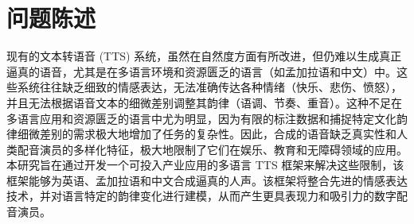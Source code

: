 \section*{问题陈述}

现有的文本转语音 (TTS) 系统，虽然在自然度方面有所改进，但仍难以生成真正逼真的语音，尤其是在多语言环境和资源匮乏的语言（如孟加拉语和中文）中。这些系统往往缺乏细致的情感表达，无法准确传达各种情绪（快乐、悲伤、愤怒），并且无法根据语音文本的细微差别调整其韵律（语调、节奏、重音）。这种不足在多语言应用和资源匮乏的语言中尤为明显，因为有限的标注数据和捕捉特定文化韵律细微差别的需求极大地增加了任务的复杂性。因此，合成的语音缺乏真实性和人类配音演员的多样化特征，极大地限制了它们在娱乐、教育和无障碍领域的应用。本研究旨在通过开发一个可投入产业应用的多语言 TTS 框架来解决这些限制，该框架能够为英语、孟加拉语和中文合成逼真的人声。该框架将整合先进的情感表达技术，并对语言特定的韵律变化进行建模，从而产生更具表现力和吸引力的数字配音演员。